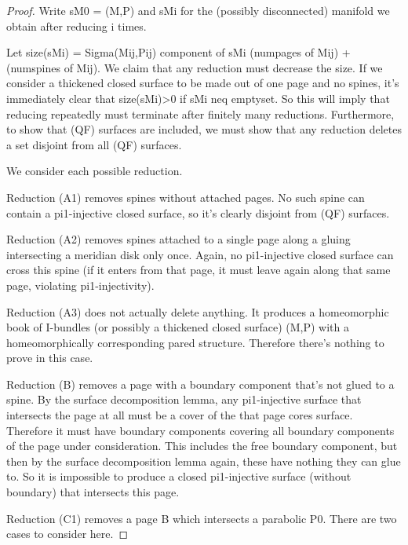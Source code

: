 \begin{proof}

Write sM0 = (M,P) and sMi for the (possibly disconnected) manifold we obtain
after reducing i times.

Let size(sMi) = Sigma{(Mij,Pij) component of sMi} (num{pages of Mij})
+ (num{spines of Mij}). We claim that any reduction must decrease the size. If
we consider a thickened closed surface to be made out of one page and no
spines, it's immediately clear that size(sMi)>0 if sMi neq emptyset. So this
will imply that reducing repeatedly must terminate after finitely many
reductions. Furthermore, to show that (QF) surfaces are included, we must show
that any reduction deletes a set disjoint from all (QF) surfaces.

We consider each possible reduction.

Reduction (A1) removes spines without attached pages. No such spine can contain
a pi1-injective closed surface, so it's clearly disjoint from (QF) surfaces.

Reduction (A2) removes spines attached to a single page along a gluing
intersecting a meridian disk only once. Again, no pi1-injective closed surface
can cross this spine (if it enters from that page, it must leave again along
that same page, violating pi1-injectivity).


Reduction (A3) does not actually delete anything. It produces a homeomorphic
book of I-bundles (or possibly a thickened closed surface) (M,P) with
a homeomorphically corresponding pared structure. Therefore there's nothing to
prove in this case.

Reduction (B) removes a page with a boundary component that's not glued to
a spine. By the surface decomposition lemma, any pi1-injective surface that
intersects the page at all must be a cover of the that page cores surface.
Therefore it must have boundary components covering all boundary components of
the page under consideration. This includes the free boundary component, but
then by the surface decomposition lemma again, these have nothing they can glue
to. So it is impossible to produce a closed pi1-injective surface (without
boundary) that intersects this page.

Reduction (C1) removes a page B which intersects a parabolic P0. There are two
cases to consider here.


\end{proof}
